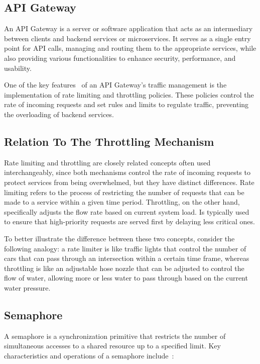 \subsection{API Gateway}\label{subsec:rate-limiter-api-gateway}

An API Gateway is a server or software application that acts as an intermediary between clients and backend services or microservices.
It serves as a single entry point for API calls, managing and routing them to the appropriate services, while also providing various functionalities to enhance security, performance, and usability.

One of the key features~\cite{api-gateway} of an API Gateway's traffic management is the implementation of rate limiting and throttling policies.
These policies control the rate of incoming requests and set rules and limits to regulate traffic, preventing the overloading of backend services.

\subsection{Relation To The Throttling Mechanism}\label{subsec:rate-limiter-throttling}

Rate limiting and throttling are closely related concepts often used interchangeably,
since both mechanisms control the rate of incoming requests to protect services from being overwhelmed, but they have distinct differences.
Rate limiting refers to the process of restricting the number of requests that can be made to a service within a given time period.
Throttling, on the other hand,
specifically adjusts the flow rate based on current system load.
Is typically used to ensure that high-priority requests are served first by delaying less critical ones.

To better illustrate the difference between these two concepts, consider the following analogy:
a rate limiter is like traffic lights that control the number of cars that can pass through an intersection within a certain time frame,
whereas throttling is like an adjustable hose nozzle that can be adjusted to control the flow of water, allowing more or less water to pass through based on the current water pressure.

\subsection{Semaphore}\label{subsec:rate-limiter-semaphore}

A semaphore is a synchronization primitive that restricts the number of simultaneous accesses to a shared resource up to a specified limit.
Key characteristics and operations of a semaphore include~\cite{java-semaphore, oracle-multithreaded-programming-guide}:

